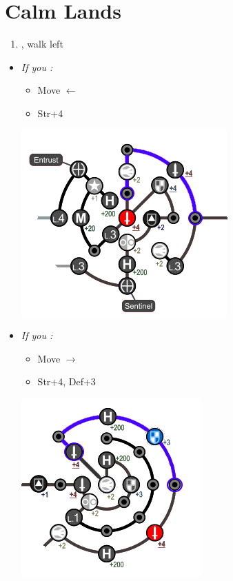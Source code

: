\chapter{Calm Lands}

\begin{enumerate}
	\item \sd, walk left
\end{enumerate}
\begin{spheregrid}
	\begin{itemize}
		\yunaf
		\item \textit{If you \wonblitz:}
		      \begin{itemize}
			      \item Move $\leftarrow$
			      \item Str+4
		      \end{itemize}
		      \includegraphics{graphics/yuna_blitz_win_highbridge_2}
		\item \textit{If you \lostblitz:}
		      \begin{itemize}
			      \item Move $\rightarrow$
			      \item Str+4, Def+3
		      \end{itemize}
		      \includegraphics{graphics/yuna_blitz_loss_highbridge_2}
	\end{itemize}
\end{spheregrid}
